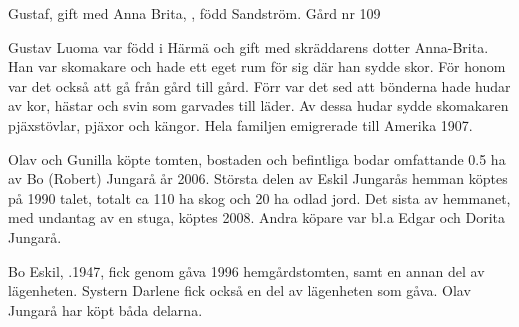 %
Gustaf,  gift med Anna Brita, , född Sandström. Gård nr 109
\begin{jhchildren}
  \item {}
  \item {}
  \item {}
  \item {}
  \item {}
  \item {}
  \item {}
  \item {}
  \item {}
\end{jhchildren}
Gustav Luoma var född i Härmä och gift med skräddarens dotter Anna-Brita. Han var skomakare och hade ett eget rum för sig där han sydde skor. För honom var det också att gå från gård till gård. Förr var det sed att bönderna hade hudar av kor, hästar och svin som garvades till läder. Av dessa hudar sydde skomakaren pjäxstövlar, pjäxor och kängor. Hela familjen emigrerade till Amerika 1907.



%



%
Olav och Gunilla köpte tomten, bostaden och befintliga bodar omfattande 0.5 ha av Bo (Robert) Jungarå år 2006. Största delen av Eskil Jungarås hemman köptes på 1990 talet, totalt ca 110 ha skog och 20 ha odlad jord. Det sista av hemmanet, med undantag av en stuga, köptes 2008. Andra köpare var bl.a Edgar och Dorita Jungarå.


%
Bo Eskil, .1947, fick genom gåva 1996 hemgårdstomten, samt en annan del av lägenheten. Systern Darlene fick också en del av lägenheten som gåva. Olav Jungarå har köpt båda delarna.


